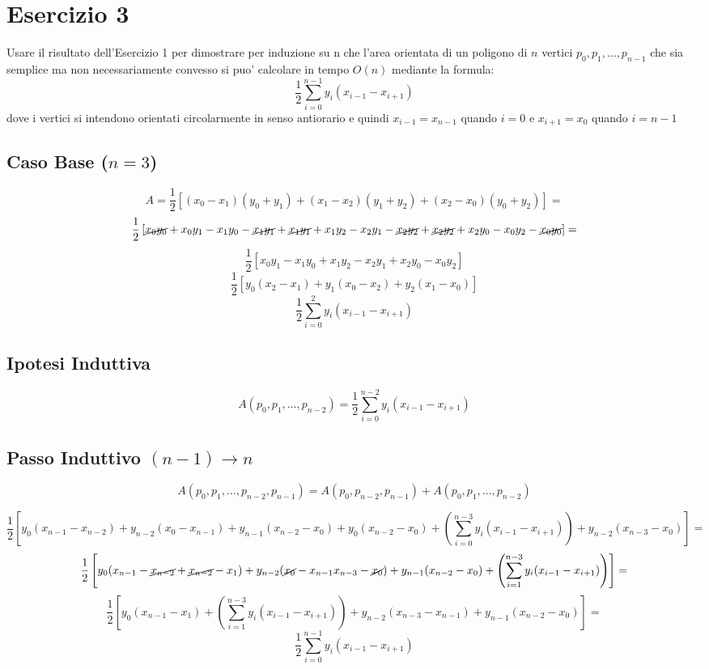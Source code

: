\documentclass{article}
\begin{document}
\section*{Esercizio 3}

Usare il risultato dell'Esercizio 1 per dimostrare per induzione su n che l'area orientata
di un poligono di $n$ vertici $p_0, p_1, \dots, p_{n-1}$ che sia semplice ma non necessariamente 
convesso si puo' calcolare in tempo $O(n)$ mediante la formula:
$$
\frac{1}{2}\sum_{i = 0}^{n-1} y_i (x_{i-1} - x_{i+1})
$$
dove i vertici si intendono orientati circolarmente in senso antiorario e quindi $x_{i-1} = x_{n-1}$
quando $i = 0$ e $x_{i+1} = x_0$ quando $i = n - 1$
\subsection*{Caso Base ($n = 3$)}
$$
A = \frac{1}{2} \left[ (x_0 - x_1)(y_0 + y_1) + (x_1 - x_2)(y_1 + y_2) + (x_2 - x_0)(y_0 + y_2) \right] =
$$
$$
\frac{1}{2} \left[ \cancel{x_0y_0} + x_0y_1 - x_1y_0 - \cancel{x_1y_1} + \cancel{x_1y_1} + x_1y_2 - x_2y_1 - \cancel{x_2y_2} + \cancel{x_2y_2} + x_2y_0 -x_0y_2 - \cancel{x_0y_0} \right] =  
$$
$$
\frac{1}{2} \left[ x_0y_1 - x_1y_0 + x_1y_2 - x_2y_1 + x_2y_0 - x_0y_2 \right]
$$
$$
\frac{1}{2} \left[ y_0 (x_2 - x_1) + y_1 (x_0 - x_2) + y_2 (x_1 - x_0) \right] 
$$
$$
\frac{1}{2} \sum_{i = 0}^{2} y_i (x_{i-1} - x_{i+1})
$$
\subsection*{Ipotesi Induttiva}
$$
A(p_0, p_1, \dots, p_{n-2}) = \frac{1}{2} \sum_{i = 0}^{n-2} y_i (x_{i-1} - x_{i+1})
$$

\subsection*{Passo Induttivo $(n-1) \rightarrow n$}
$$
A(p_0, p_1, \dots,  p_{n-2},  p_{n-1}) = A(p_0, p_{n-2},  p_{n-1}) + A(p_0, p_1, \dots, p_{n-2})
$$

$$
\frac{1}{2} \left[ y_0 (x_{n-1} - x_{n-2}) + y_{n-2} (x_{0} - x_{n-1}) + y_{n-1} (x_{n-2} - x_{0}) + 
y_0 (x_{n-2} - x_0) + \left( \sum_{i = 0}^{n-3} y_i (x_{i-1} - x_{i+1}) \right)  + y_{n-2} (x_{n-3} - x_{0}) \right] =
$$
$$
\frac{1}{2} \left[ y_0 (x_{n-1} - \cancel{x_{n-2}} + \cancel{x_{n-2}} - x_{1}) + y_{n-2} (\cancel{x_{0}} - x_{n-1} x_{n-3} - \cancel{x_{0}}) + y_{n-1} (x_{n-2} - x_{0})  +
 \left( \sum_{i = 1}^{n-3} y_i (x_{i-1} - x_{i+1}) \right) \right] =
$$
$$
\frac{1}{2} \left[ y_0 (x_{n-1} - x_{1}) +  \left( \sum_{i = 1}^{n-3} y_i (x_{i-1} - x_{i+1}) \right) + y_{n-2} (x_{n-3} - x_{n-1}) + y_{n-1} (x_{n-2} - x_{0}) \right] =
$$
$$
\frac{1}{2}\sum_{i = 0}^{n-1} y_i (x_{i-1} - x_{i+1})
$$
\end{document}
